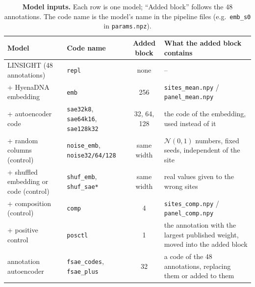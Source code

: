 \documentclass[11pt]{article}
\newcommand{\file}[1]{\nolinkurl{#1}}
\begin{document}
\begin{table}[t]
\centering\footnotesize
\caption{\textbf{Model inputs.} Each row is one model; ``Added block'' follows the 48 annotations. The code
name is the model's name in the pipeline files (e.g.\ \texttt{emb\_s0} in \file{params.npz}).}
\label{tab:inputs}
\begin{tabularx}{\textwidth}{@{}l l c X@{}}
\toprule
Model & Code name & Added block & What the added block contains \\
\midrule
LINSIGHT (48 annotations) & \texttt{repl} & none & -- \\
+ HyenaDNA embedding & \texttt{emb} & 256 & \file{sites_mean.npy} / \file{panel_mean.npy} \\
+ autoencoder code & \texttt{sae32k8}, \texttt{sae64k16}, \texttt{sae128k32} & 32, 64, 128 & the code of the embedding, used instead of it \\
+ random columns (control) & \texttt{noise\_emb}, \texttt{noise32/64/128} & same width & $\mathcal{N}(0,1)$ numbers, fixed seeds, independent of the site \\
+ shuffled embedding or code (control) & \texttt{shuf\_emb}, \texttt{shuf\_sae*} & same width & real values given to the wrong sites \\
+ composition (control) & \texttt{comp} & 4 & \file{sites_comp.npy} / \file{panel_comp.npy} \\
+ positive control & \texttt{posctl} & 1 & the annotation with the largest published weight, moved into the added block \\
annotation autoencoder & \texttt{fsae\_codes}, \texttt{fsae\_plus} & 32 & a code of the 48 annotations, replacing them or added to them \\
\bottomrule
\end{tabularx}
\end{table}
\end{document}
